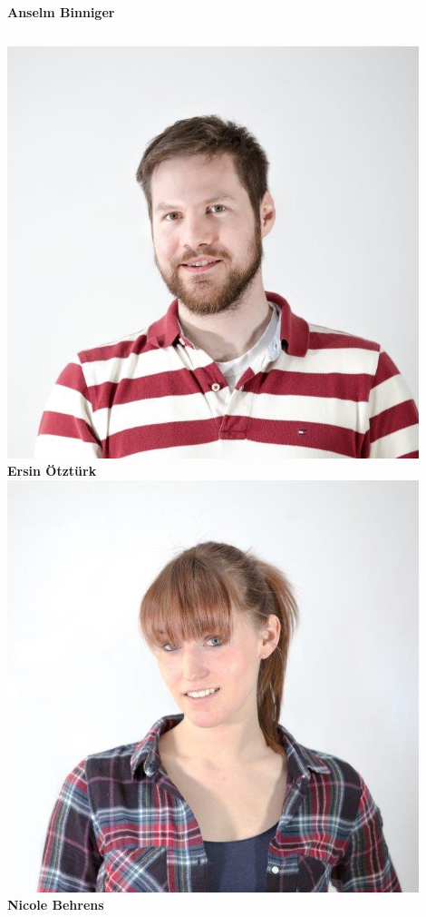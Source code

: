\documentclass{beamer}
\begin{document}
\begin{frame}[t]
\begin{columns}[t]
    		\\
    		\textbf{Anselm Binniger}
    	\end{columns}
    	\begin{columns}[t]
    		\includegraphics[width=0.9\textwidth]{ersin.jpg}
    		\\
    		\textbf{Ersin Ötztürk}
    		\includegraphics[width=0.9\textwidth]{nicole.jpg}
    		\\
    		\textbf{Nicole Behrens}
    	\end{columns}
    \end{frame}
    
\end{document}
